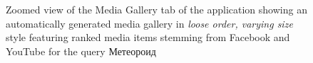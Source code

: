 \documentclass{sig-alternate}
\begin{document}
\begin{figure}[t!]
  \centering
  \setlength{\fboxsep}{1pt}
  \caption{Zoomed view of the Media Gallery tab of the application
    showing an automatically generated media gallery in \emph{loose order, varying size} style
    featuring ranked media items stemming from Facebook and YouTube for the query
    \selectfont Метеороид \selectfont}
  \label{fig:media-gallery}
\end{figure}



\end{document}
